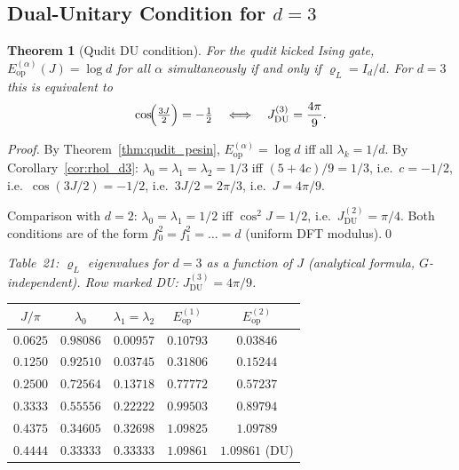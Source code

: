 \documentclass[12pt,a4paper]{article}
\newtheorem{theorem}{Theorem}[section]
\begin{document}
\subsection{Dual-Unitary Condition for $d=3$}

\begin{theorem}[Qudit DU condition]\label{thm:qudit_du}
For the qudit kicked Ising gate, $E^{(\alpha)}_{\mathrm{op}}(J)=\log d$
for all $\alpha$ simultaneously if and only if $\varrho_{L}=I_{d}/d$.
For $d=3$ this is equivalent to
\[
  \cos\!\Bigl(\tfrac{3J}{2}\Bigr) = -\tfrac{1}{2}
  \quad\Longleftrightarrow\quad
  J_{\mathrm{DU}}^{(3)} = \frac{4\pi}{9}.
\]
\end{theorem}

\begin{proof}
By Theorem~\ref{thm:qudit_pesin}, $E^{(\alpha)}_{\mathrm{op}}=\log d$ iff all
$\lambda_{k}=1/d$.  By Corollary~\ref{cor:rhol_d3}:
$\lambda_{0}=\lambda_{1}=\lambda_{2}=1/3$ iff $(5+4c)/9=1/3$, i.e.\ $c=-1/2$,
i.e.\ $\cos(3J/2)=-1/2$, i.e.\ $3J/2=2\pi/3$, i.e.\ $J=4\pi/9$.

Comparison with $d=2$: $\lambda_{0}=\lambda_{1}=1/2$ iff $\cos^{2}\!J=1/2$,
i.e.\ $J_{\mathrm{DU}}^{(2)}=\pi/4$.  Both conditions are of the form
$f_{0}^{2}=f_{1}^{2}=\ldots=d$ (uniform DFT modulus).\qed
\end{proof}

\noindent\textit{Table~21: $\varrho_{L}$ eigenvalues for $d=3$ as a function of $J$
(analytical formula, $G$-independent).  Row marked DU: $J_{\mathrm{DU}}^{(3)}=4\pi/9$.}

\begin{center}
\begin{tabular}{@{}ccccc@{}}
\toprule
$J/\pi$ & $\lambda_{0}$ & $\lambda_{1}{=}\lambda_{2}$ & $E^{(1)}_{\mathrm{op}}$ & $E^{(2)}_{\mathrm{op}}$\\
\midrule
$0.0625$ & $0.98086$ & $0.00957$ & $0.10793$ & $0.03846$\\
$0.1250$ & $0.92510$ & $0.03745$ & $0.31806$ & $0.15244$\\
$0.2500$ & $0.72564$ & $0.13718$ & $0.77772$ & $0.57237$\\
$0.3333$ & $0.55556$ & $0.22222$ & $0.99503$ & $0.89794$\\
$0.4375$ & $0.34605$ & $0.32698$ & $1.09825$ & $1.09789$\\
$0.4444$ & $0.33333$ & $0.33333$ & $1.09861$ & $1.09861$ (DU)\\
\bottomrule
\end{tabular}
\end{center}
\end{document}

